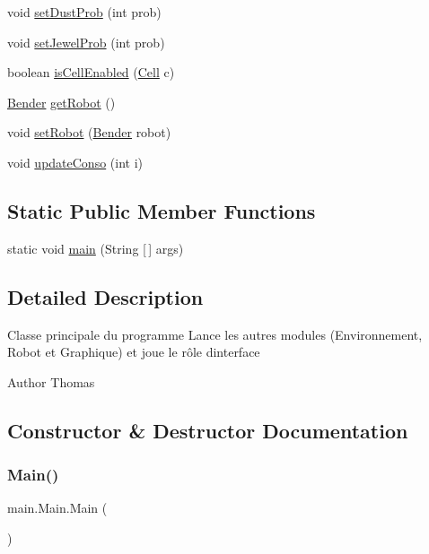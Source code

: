 \begin{DoxyCompactItemize}
\item 
void \hyperlink{classmain_1_1_main_a4fe27a92bfb4ab6b91100b78d5e60984}{set\+Dust\+Prob} (int prob)
\item 
void \hyperlink{classmain_1_1_main_a300ba85da3a72bc7ca9ad5f5b5a104ed}{set\+Jewel\+Prob} (int prob)
\item 
boolean \hyperlink{classmain_1_1_main_a5052a776c99a2dadce1fe83501e5860e}{is\+Cell\+Enabled} (\hyperlink{classenvironnement_1_1_cell}{Cell} c)
\item 
\hyperlink{class_i_a_1_1_bender}{Bender} \hyperlink{classmain_1_1_main_afa1c1d8de2dbeb639cf157413f82aec2}{get\+Robot} ()
\item 
void \hyperlink{classmain_1_1_main_ab2bea62d3409f687309c3ce697825c63}{set\+Robot} (\hyperlink{class_i_a_1_1_bender}{Bender} robot)
\item 
void \hyperlink{classmain_1_1_main_a676892cd2586d3b8d20e05451f306fba}{update\+Conso} (int i)
\end{DoxyCompactItemize}
\subsection*{Static Public Member Functions}
\begin{DoxyCompactItemize}
\item 
static void \hyperlink{classmain_1_1_main_ab607ced846a257d28e8f81d1820d587c}{main} (String \mbox{[}$\,$\mbox{]} args)
\end{DoxyCompactItemize}


\subsection{Detailed Description}
Classe principale du programme Lance les autres modules (Environnement, Robot et Graphique) et joue le rôle d\textquotesingle{}interface \begin{DoxyAuthor}{Author}
Thomas 
\end{DoxyAuthor}


\subsection{Constructor \& Destructor Documentation}
\hypertarget{classmain_1_1_main_a3bd36c15a333d7b594eb71f68a938492}{}\label{classmain_1_1_main_a3bd36c15a333d7b594eb71f68a938492} 
\subsubsection{\texorpdfstring{Main()}{Main()}}
{\footnotesize\ttfamily main.\+Main.\+Main (\begin{DoxyParamCaption}{ }\end{DoxyParamCaption})}

